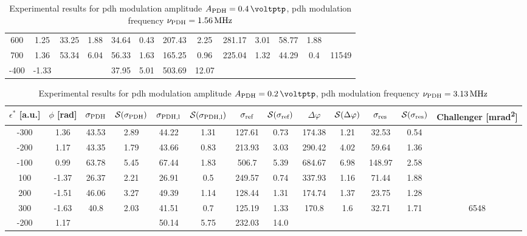 \begin{landscape}
\begin{table}
\begin{tabular}{|c|c|c|c|c|c|c|c|c|c|c|c|c|}
		600 & 1.25 & 33.25 & 1.88 & 34.64 & 0.43 & 207.43 & 2.25 & 281.17 & 3.01 & 58.77 & 1.88 & \\
		700 & 1.36 & 53.34 & 6.04 & 56.33 & 1.63 & 165.25 & 0.96 & 225.04 & 1.32 & 44.29 & 0.4 & 11549\\
		\hline
		\hline
		-400 & -1.33 & & & 37.95 & 5.01 & 503.69 & 12.07 & & & & & \\
		\hline
	\end{tabular}
	\caption{Experimental results for \gls{pdh} modulation amplitude $\tind{A}{PDH} = \SI{0.4}{\voltptp}$, \gls{pdh} modulation frequency $\nu_{\text{PDH}} = \SI{1.56}{\mega\hertz}$}
	\end{table}
	
	
	\begin{table}
	\centering
	\begin{tabular}{|c|c|c|c|c|c|c|c|c|c|c|c|c|}
		\hline
		$\epsilon^*$ [a.u.] & $\phi$ [\si{\radian}] & $\sigma_{\text{PDH}}$ & $\mathcal{S}(\sigma_{\text{PDH}})$ & $\sigma_{\text{PDH,l}}$ & $\mathcal{S}(\sigma_{\text{PDH,l}})$  & $\sigma_{\text{ref}}$ & $\mathcal{S}(\sigma_{\text{ref}})$ & $\Delta \varphi$ & $\mathcal{S}(\Delta \varphi)$ & $\sigma_{\text{res}}$  & $\mathcal{S}(\sigma_{\text{res}})$ & Challenger [\si{\milli\radian\squared}] \\
		\hline
		\hline
		-300 & 1.36 & 43.53 & 2.89 & 44.22 & 1.31 & 127.61 & 0.73 & 174.38 & 1.21 & 32.53 & 0.54 & \\
		-200 & 1.17 & 43.35 & 1.79 & 43.66 & 0.83 & 213.93 & 3.03 & 290.42 & 4.02 & 59.64 & 1.36 & \\
		-100 & 0.99 & 63.78 & 5.45 & 67.44 & 1.83 & 506.7 & 5.39 & 684.67 & 6.98 & 148.97 & 2.58 & \\
		100 & -1.37 & 26.37 & 2.21 & 26.91 & 0.5 & 249.57 & 0.74 & 337.93 & 1.16 & 71.44 & 1.88 & \\
		200 & -1.51 & 46.06 & 3.27 & 49.39 & 1.14 & 128.44 & 1.31 & 174.74 & 1.37 & 23.75 & 1.28 & \\
		300 & -1.63 & 40.8 & 2.03 & 41.51 & 0.7 & 125.19 & 1.33 & 170.8 & 1.6 & 32.71 & 1.71 & 6548\\
		\hline
		\hline
		-200 & 1.17 & & & 50.14 & 5.75 & 232.03 & 14.0 & & & & & \\
		\hline
	\end{tabular}
	\caption{Experimental results for \gls{pdh} modulation amplitude $\tind{A}{PDH} = \SI{0.2}{\voltptp}$, \gls{pdh} modulation frequency $\nu_{\text{PDH}} = \SI{3.13}{\mega\hertz}$}
	\end{table}
	

\end{landscape}
